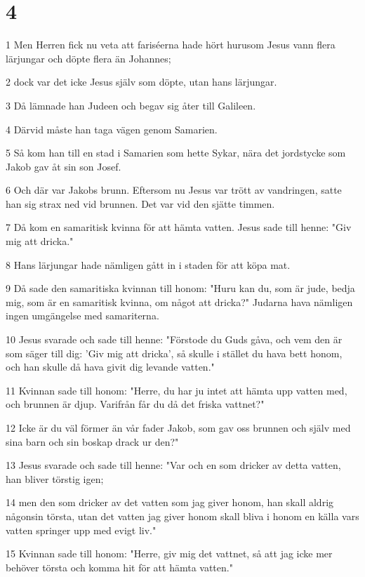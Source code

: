 \chapter{4}

\par 1 Men Herren fick nu veta att fariséerna hade hört hurusom Jesus vann flera lärjungar och döpte flera än Johannes;
\par 2 dock var det icke Jesus själv som döpte, utan hans lärjungar.
\par 3 Då lämnade han Judeen och begav sig åter till Galileen.
\par 4 Därvid måste han taga vägen genom Samarien.
\par 5 Så kom han till en stad i Samarien som hette Sykar, nära det jordstycke som Jakob gav åt sin son Josef.
\par 6 Och där var Jakobs brunn. Eftersom nu Jesus var trött av vandringen, satte han sig strax ned vid brunnen. Det var vid den sjätte timmen.
\par 7 Då kom en samaritisk kvinna för att hämta vatten. Jesus sade till henne: "Giv mig att dricka."
\par 8 Hans lärjungar hade nämligen gått in i staden för att köpa mat.
\par 9 Då sade den samaritiska kvinnan till honom: "Huru kan du, som är jude, bedja mig, som är en samaritisk kvinna, om något att dricka?" Judarna hava nämligen ingen umgängelse med samariterna.
\par 10 Jesus svarade och sade till henne: "Förstode du Guds gåva, och vem den är som säger till dig: 'Giv mig att dricka', så skulle i stället du hava bett honom, och han skulle då hava givit dig levande vatten."
\par 11 Kvinnan sade till honom: "Herre, du har ju intet att hämta upp vatten med, och brunnen är djup. Varifrån får du då det friska vattnet?"
\par 12 Icke är du väl förmer än vår fader Jakob, som gav oss brunnen och själv med sina barn och sin boskap drack ur den?"
\par 13 Jesus svarade och sade till henne: "Var och en som dricker av detta vatten, han bliver törstig igen;
\par 14 men den som dricker av det vatten som jag giver honom, han skall aldrig någonsin törsta, utan det vatten jag giver honom skall bliva i honom en källa vars vatten springer upp med evigt liv."
\par 15 Kvinnan sade till honom: "Herre, giv mig det vattnet, så att jag icke mer behöver törsta och komma hit för att hämta vatten."
